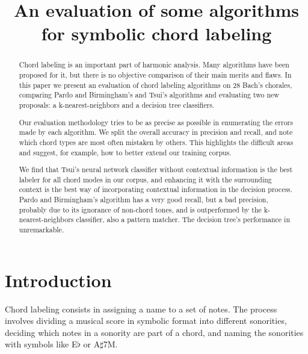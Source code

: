 \documentclass{article}
\title{An evaluation of some algorithms for symbolic chord labeling}
\begin{document}
\graphicspath{{figs/}{data/}}
\maketitle

\begin{abstract}

  Chord labeling is an important part of harmonic analysis. Many
  algorithms have been proposed for it, but there is no objective
  comparison of their main merits and flaws. In this paper we present
  an evaluation of chord labeling algorithms on 28 Bach's chorales,
  comparing Pardo and Birmingham's and Tsui's algorithms and
  evaluating two new proposals: a k-nearest-neighbors and a decision
  tree classifiers.
  
  Our evaluation methodology tries to be as precise as possible in
  enumerating the errors made by each algorithm. We split the overall
  accuracy in precision and recall, and note which chord types are
  most often mistaken by others. This highlights the difficult areas
  and suggest, for example, how to better extend our training
  corpus. 
  
  We find that Tsui's neural network classifier without contextual
  information is the best labeler for all chord modes in our corpus,
  and enhancing it with the surrounding context is the best way of
  incorporating contextual information in the decision process. Pardo
  and Birmingham's algorithm has a very good recall, but a bad
  precision, probably due to its ignorance of non-chord tones, and is
  outperformed by the k-nearest-neighbors classifier, also a pattern
  matcher. The decision tree's performance in unremarkable.
\end{abstract}

\section{Introduction}
\label{sec:introduction}

Chord labeling consists in assigning a name to a set of notes. The
process involves dividing a musical score in symbolic format into
different sonorities, deciding which notes in a sonority are part of a
chord, and naming the sonorities with symbols like E$\flat$ or
A$\sharp$7M.
\end{document}
